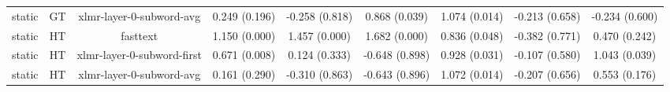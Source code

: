 \begin{sidewaystable}[htb]
\begin{tabular}{@{}ccccccccc@{}}
        static & GT & xlmr-layer-0-subword-avg & 0.249 (0.196) & -0.258 (0.818) & 0.868 (0.039) & 1.074 (0.014) & -0.213 (0.658) & -0.234 (0.600) \\
        static & HT & fasttext & 1.150 (0.000) & 1.457 (0.000) & 1.682 (0.000) & 0.836 (0.048) & -0.382 (0.771) & 0.470 (0.242) \\
        static & HT & xlmr-layer-0-subword-first & 0.671 (0.008) & 0.124 (0.333) & -0.648 (0.898) & 0.928 (0.031) & -0.107 (0.580) & 1.043 (0.039) \\
        static & HT & xlmr-layer-0-subword-avg & 0.161 (0.290) & -0.310 (0.863) & -0.643 (0.896) & 1.072 (0.014) & -0.207 (0.656) & 0.553 (0.176) \\
        \bottomrule
    \end{tabular}
\end{sidewaystable}